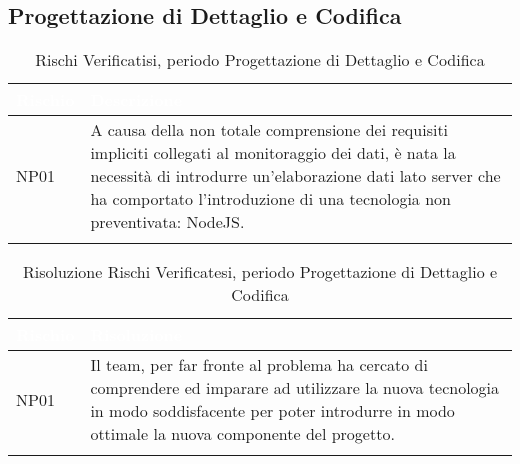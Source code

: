 \subsection{Progettazione di Dettaglio e Codifica}\label{ARRQ}
\begin{longtable}{|C{.15\textwidth}|C{.79\textwidth}|}
	\hline
	\textbf{\textcolor{white}{Rischio}} & \textbf{\textcolor{white}{Descrizione}} \\
	\hline \hline
	\endfirsthead
	NP01 & A causa della non totale comprensione dei requisiti impliciti collegati al monitoraggio dei dati, è nata la necessità di introdurre un'elaborazione dati lato server che ha comportato l'introduzione di una tecnologia non preventivata: NodeJS.\\ 
	\hline
	\caption{Rischi Verificatisi, periodo Progettazione di Dettaglio e Codifica}
	\label{tab:analisiRischiRQ}
\end{longtable}

\begin{longtable}{|C{.15\textwidth}|C{.79\textwidth}|}
	\hline
	\textbf{\textcolor{white}{Rischio}} & \textbf{\textcolor{white}{Risoluzione}} \\
	\hline \hline
	\endfirsthead
	NP01 & Il team, per far fronte al problema ha cercato di comprendere ed imparare ad utilizzare la nuova tecnologia in modo soddisfacente per poter introdurre in modo ottimale la nuova componente del progetto.\\ 
	\hline
	\caption{Risoluzione Rischi Verificatesi, periodo Progettazione di Dettaglio e Codifica}
	\label{tab:risoluzioneRischiRQ}
\end{longtable}

\pagebreak


